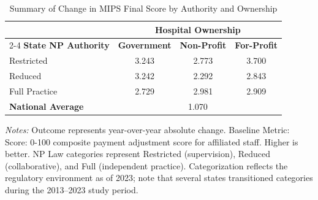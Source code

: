 \begin{table}[htbp]
    \centering
    \caption{Summary of Change in MIPS Final Score by Authority and Ownership}
    \label{tab:d_mips_final_score}
    \vspace{0.2cm}
    \begin{tabular}{lccc}
        \toprule
        & \multicolumn{3}{c}{\textbf{Hospital Ownership}} \\
        \cmidrule(lr){2-4}
        \textbf{State NP Authority} & \textbf{Government} & \textbf{Non-Profit} & \textbf{For-Profit} \\
        \midrule
        Restricted & 3.243 & 2.773 & 3.700 \\
        Reduced & 3.242 & 2.292 & 2.843 \\
        Full Practice & 2.729 & 2.981 & 2.909 \\
        \midrule
        \textbf{National Average} & \multicolumn{3}{c}{1.070} \\
        \bottomrule
    \end{tabular}
    \vspace{0.1cm}
    \begin{minipage}{0.85\textwidth}
        \footnotesize \textit{Notes:} Outcome represents year-over-year absolute change. Baseline Metric: Score: 0-100 composite payment adjustment score for affiliated staff. Higher is better. NP Law categories represent Restricted (supervision), Reduced (collaborative), and Full (independent practice). Categorization reflects the regulatory environment as of 2023; note that several states transitioned categories during the 2013--2023 study period.
    \end{minipage}
\end{table}